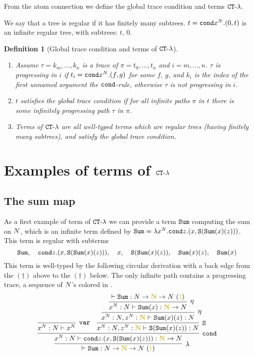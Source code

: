 \documentclass{article}
\newtheorem{definition}[theorem]{Definition}
\begin{document}
From the atom connection we define the global trace condition and terms ${ {\tt CT} \mbox{-} \lambda}$.

We say that a tree is regular if it has finitely many subtrees. $t={\tt cond} x^{N}.(0,t)$ is an infinite regular tree,
with subtrees: $t$, $0$.

\begin{definition}[Global trace condition and terms of ${ {\tt CT} \mbox{-} \lambda}$]
\begin{enumerate}
\item
Assume $\tau = k_m, \ldots, k_n$ is a trace of $\pi =t_0, \ldots, t_n$ and $i=m,\ldots, n$.
$\tau$ is progressing in $i$ if $t_i={\tt cond} x^{N}.(f,g)$ for some $f$, $g$,
and $k_i$ is the index of the first \emph{unnamed} argument the ${\tt cond}$-rule, 
otherwise $\tau$ is not progressing in $i$.

\item
$t$ satisfies the global trace condition if for all infinite paths $\pi$ in $t$ 
there is some infinitely progressing path $\tau$ in $\pi$.

\item
Terms of ${ {\tt CT} \mbox{-} \lambda}$ are all well-typed terms which are regular trees (having finitely many subtrees), 
and satisfy the global trace condition.

\end{enumerate}
\end{definition}


\section{Examples of terms of ${ {\tt CT} \mbox{-} \lambda}$}

\subsection{The sum map}
As a first example of term of  ${ {\tt CT} \mbox{-} \lambda}$ we can provide a term ${\tt Sum}$ computing the sum on ${N}$,
which is an infinite term defined by ${\tt Sum} = \lambda x^{N}.{\tt cond} z.(x,{\tt S}({\tt Sum}(x)(z)))$.
This term is regular with subterms 
$$
\Sum, \  \  \ \cond z.(x,\Succ(\Sum(x)(z))), 
\  \  \ x, \  \  \ \Succ(\Sum(x)(z)),  \  \  \ \Sum(x)(z), \  \  \ \Sum(x)
$$
This term is well-typed by the following circular derivation with a back edge from the $(\dagger)$ above to the $(\dagger)$ below.
The only infinite path contains a progressing trace, a sequence of ${N}$'s colored in 
. 
\[
\infer[\lambda]{
  \vdash \Sum:\N \rightarrow \bfColor{oldgold}{\N} \rightarrow \N\ 
(\bfColor{oldgold}{\dagger})
}{
  \infer[\cond]{
    x^\N : \N \vdash \cond z.(x,\Succ(\Sum(x)(z))): \bfColor{oldgold}{\N} \rightarrow \N
  }{
    \infer[\var]{
      x^\N : \N \vdash x^\N
    }{}
    &
    \infer[\Succ]{
      x^\N:\N, z^\N : \bfColor{oldgold}{\N} \vdash \Succ(\Sum(x)(z)): \N
    }{
      \infer[\eta]{
       x^\N:\N, z^\N : \bfColor{oldgold}{\N} \vdash \Sum(x)(z): \N
      }{
        \infer[\eta]{
          x^\N : \N \vdash \Sum(x): \bfColor{oldgold}{\N} \rightarrow \N
        }{
          \vdash \Sum: \N \rightarrow \bfColor{oldgold}{\N} \rightarrow \N\ 
(\bfColor{oldgold}{\dagger})
        }
      }
    }
  }
}
\]
\end{document}
